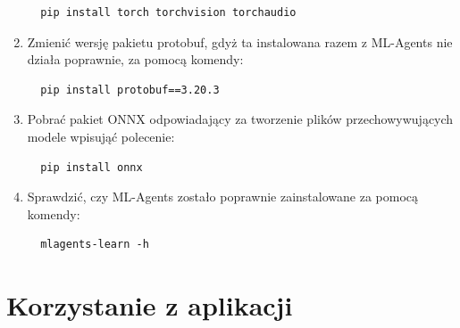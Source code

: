 \documentclass{SGGW-thesis}
\begin{document}
\begin{enumerate}
{\begin{lstlisting}
  pip install torch torchvision torchaudio
  \end{lstlisting}
  }
  \item{Zmienić wersję pakietu protobuf, gdyż ta instalowana razem z ML-Agents nie działa poprawnie, za pomocą komendy:
  \begin{lstlisting}
  pip install protobuf==3.20.3
  \end{lstlisting}
  }
  \item{Pobrać pakiet ONNX odpowiadający za tworzenie plików przechowywujących modele wpisująć polecenie:
  \begin{lstlisting}
  pip install onnx
  \end{lstlisting}
  }
  \item{Sprawdzić, czy ML-Agents zostało poprawnie zainstalowane za pomocą komendy:
  \begin{lstlisting}
  mlagents-learn -h
  \end{lstlisting}
  }
\end{enumerate}

\section{Korzystanie z aplikacji}
\end{document}
